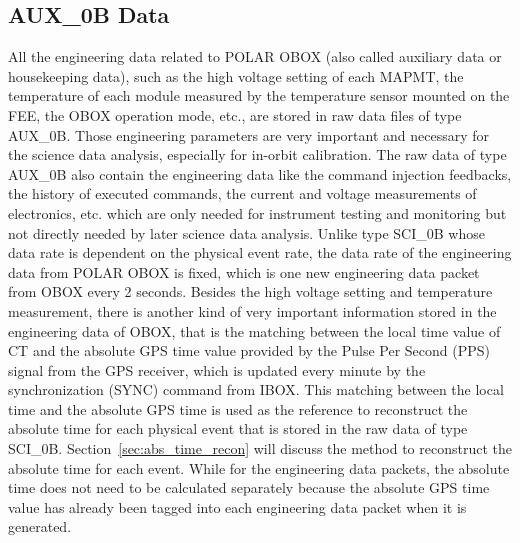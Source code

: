 \documentclass{raa}
\begin{document}
\subsection{AUX\_0B Data}
All the engineering data related to POLAR OBOX (also called auxiliary data or housekeeping data), such as the high voltage setting of each MAPMT, the temperature of each module measured by the temperature sensor mounted on the FEE, the OBOX operation mode, etc., are stored in raw data files of type AUX\_0B. Those engineering parameters are very important and necessary for the science data analysis, especially for in-orbit calibration. The raw data of type AUX\_0B also contain the engineering data like the command injection feedbacks, the history of executed commands, the current and voltage measurements of electronics, etc. which are only needed for instrument testing and monitoring but not directly needed by later science data analysis. Unlike type SCI\_0B whose data rate is dependent on the physical event rate, the data rate of the engineering data from POLAR OBOX is fixed, which is one new engineering data packet from OBOX every 2 seconds. Besides the high voltage setting and temperature measurement, there is another kind of very important information stored in the engineering data of OBOX, that is the matching between the local time value of CT and the absolute GPS time value provided by the Pulse Per Second (PPS) signal from the GPS receiver, which is updated every minute by the synchronization (SYNC) command from IBOX. This matching between the local time and the absolute GPS time is used as the reference to reconstruct the absolute time for each physical event that is stored in the raw data of type SCI\_0B. Section~\ref{sec:abs_time_recon} will discuss the method to reconstruct the absolute time for each event. While for the engineering data packets, the absolute time does not need to be calculated separately because the absolute GPS time value has already been tagged into each engineering data packet when it is generated.
\end{document}
